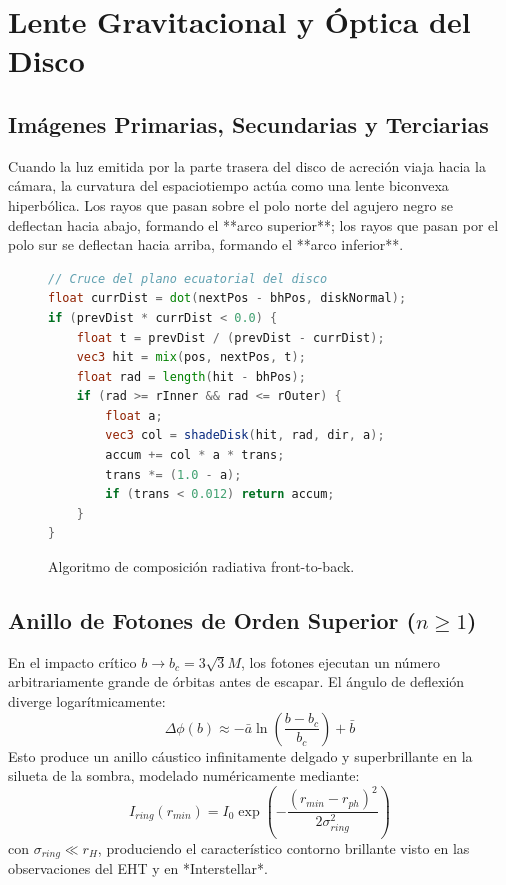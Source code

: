 \documentclass[10pt,twocolumn,a4paper]{article}
\begin{document}
\section{Lente Gravitacional y Óptica del Disco}

\subsection{Imágenes Primarias, Secundarias y Terciarias}
Cuando la luz emitida por la parte trasera del disco de acreción viaja hacia la cámara, la curvatura del espaciotiempo actúa como una lente biconvexa hiperbólica. Los rayos que pasan sobre el polo norte del agujero negro se deflectan hacia abajo, formando el **arco superior**; los rayos que pasan por el polo sur se deflectan hacia arriba, formando el **arco inferior**.

\begin{figure}[htbp]
\centering
\begin{lstlisting}[language=GLSL]
// Cruce del plano ecuatorial del disco
float currDist = dot(nextPos - bhPos, diskNormal);
if (prevDist * currDist < 0.0) {
    float t = prevDist / (prevDist - currDist);
    vec3 hit = mix(pos, nextPos, t);
    float rad = length(hit - bhPos);
    if (rad >= rInner && rad <= rOuter) {
        float a;
        vec3 col = shadeDisk(hit, rad, dir, a);
        accum += col * a * trans;
        trans *= (1.0 - a);
        if (trans < 0.012) return accum;
    }
}
\end{lstlisting}
\caption{Algoritmo de composición radiativa front-to-back.}
\label{lst:crossing}
\end{figure}

\subsection{Anillo de Fotones de Orden Superior ($n \ge 1$)}
En el impacto crítico $b \to b_c = 3\sqrt{3}M$, los fotones ejecutan un número arbitrariamente grande de órbitas antes de escapar. El ángulo de deflexión diverge logarítmicamente:
\begin{equation}
\Delta\phi(b) \approx -\bar{a} \ln\left(\frac{b - b_c}{b_c}\right) + \bar{b}
\end{equation}
Esto produce un anillo cáustico infinitamente delgado y superbrillante en la silueta de la sombra, modelado numéricamente mediante:
\begin{equation}
I_{ring}(r_{min}) = I_0 \exp\left(-\frac{(r_{min} - r_{ph})^2}{2\sigma_{ring}^2}\right)
\end{equation}
con $\sigma_{ring} \ll r_H$, produciendo el característico contorno brillante visto en las observaciones del EHT y en *Interstellar*.
\end{document}
